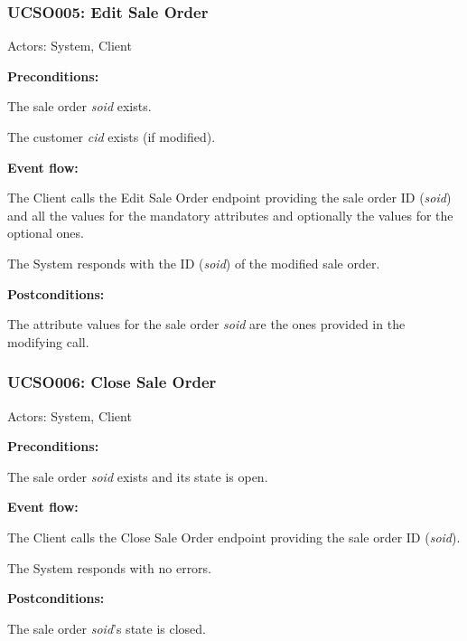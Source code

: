 \begin{ucbox}{\subsubsection{UCSO005: Edit Sale Order}}
\label{UCSO005}

Actors: System, Client

\textbf{Preconditions:}

\ucitem The sale order \textit{soid} exists.

\ucitem The customer \textit{cid} exists (if modified).

\textbf{Event flow:}

\ucitem The Client calls the Edit Sale Order endpoint providing the sale order ID (\textit{soid}) and all the values for the mandatory attributes and optionally the values for the 
optional ones.

\ucitem The System responds with the ID (\textit{soid}) of the modified sale order.

\textbf{Postconditions:}

\ucitem The attribute values for the sale order \textit{soid} are the ones provided in the modifying call.

\end{ucbox}

\begin{ucbox}{\subsubsection{UCSO006: Close Sale Order}}
\label{UCSO006}

Actors: System, Client

\textbf{Preconditions:}

\ucitem The sale order \textit{soid} exists and its state is open.

\textbf{Event flow:}

\ucitem The Client calls the Close Sale Order endpoint providing the sale order ID (\textit{soid}).

\ucitem The System responds with no errors.

\textbf{Postconditions:}

\ucitem The sale order \textit{soid}’s state is closed.

\end{ucbox}

